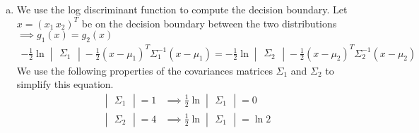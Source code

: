 \documentclass[a4paper, 10pt, twoside]{article}
\begin{document}
\begin{enumerate}[a)]
\begin{align*}
              \begin{bmatrix}0.09 & 0.6 \\ 0.6 & 4\end{bmatrix} +
              \begin{bmatrix}0.09 & 0.6 \\ 0.6 & 4\end{bmatrix} +
              \begin{bmatrix}4 & 0 \\ 0 & 0\end{bmatrix}
              \right)
              = \frac{1}{4}\begin{bmatrix}8.18 & 1.2 \\ 1.2 & 8.18\end{bmatrix}
              = \begin{bmatrix}2.045 & 0.3 \\ 0.3 & 2\end{bmatrix} \\
          \end{align*}
    \item We use the log discriminant function to compute the decision boundary. Let $x = (x_1 \, x_2)^T$ be on the decision boundary between the two distributions $\implies g_1(x) = g_2(x)$
          \begin{align}
              - \frac{1}{2} \ln \begin{vmatrix} \Sigma_1 \end{vmatrix}
              - \frac{1}{2} (x - \mu_1)^T \Sigma_1^{-1}(x - \mu_1)
              =
              - \frac{1}{2} \ln \begin{vmatrix} \Sigma_2 \end{vmatrix}
              - \frac{1}{2} (x - \mu_2)^T \Sigma_2^{-1}(x - \mu_2)\label{eq:3}
          \end{align}
          We use the following properties of the covariances matrices $\Sigma_1$ and $\Sigma_2$ to simplify this equation.
          \begin{align*}
              \begin{vmatrix}\Sigma_1\end{vmatrix} = 1 & \implies \frac{1}{2} \ln \begin{vmatrix}\Sigma_1\end{vmatrix} = 0     \\
              \begin{vmatrix}\Sigma_2\end{vmatrix} = 4 & \implies \frac{1}{2} \ln \begin{vmatrix}\Sigma_1\end{vmatrix} = \ln 2

\end{align*}
\end{enumerate}
\end{document}
